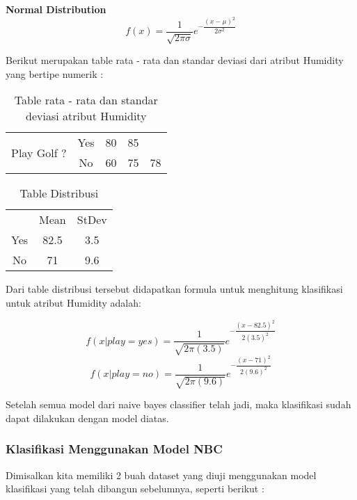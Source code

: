 		\textbf{Normal Distribution}
		\begin{equation}
			f(x) = \dfrac{1}{\sqrt{2\pi\sigma}}e^{-\dfrac{(x-\mu)^2}{2\sigma^2}}
		\end{equation}
		
		Berikut merupakan table rata - rata dan standar deviasi dari atribut Humidity yang bertipe numerik : 
		
		\begin{table}[h]
		\centering
		\caption{Table rata - rata dan standar deviasi atribut Humidity}
		\begin{tabular}{|c|c|c|c|c|}
		\toprule
		\multirow{2}{*}{Play Golf ?} & Yes & 80 & 85 & \\
		 & No & 60 & 75 & 78 \\
		\bottomrule
		\end{tabular}
		\end{table}
		
		\begin{table}[ht]
		\centering
		\caption{Table Distribusi}
		\begin{tabular}{|c|c|c|}
		\toprule
		 & Mean & StDev \\
		Yes & 82.5 & 3.5 \\
		No & 71 & 9.6 \\
		\bottomrule
		\end{tabular}
		\end{table}
		
		Dari table distribusi tersebut didapatkan formula untuk menghitung klasifikasi untuk atribut Humidity adalah:
		
		\begin{equation}
			f(x|play=yes) = \dfrac{1}{\sqrt{2\pi(3.5)}}e^{-\dfrac{(x-82.5)^2}{2(3.5)^2}}
		\end{equation}
		\begin{equation}
			f(x|play=no) = \dfrac{1}{\sqrt{2\pi(9.6)}}e^{-\dfrac{(x-71)^2}{2(9.6)^2}} 
		\end{equation}
		
		Setelah semua model dari naive bayes classifier telah jadi, maka klasifikasi sudah dapat dilakukan dengan model diatas.

\subsubsection{Klasifikasi Menggunakan Model NBC}
		Dimisalkan kita memiliki 2 buah dataset yang diuji menggunakan model klasifikasi yang telah dibangun sebelumnya, seperti berikut :
		
